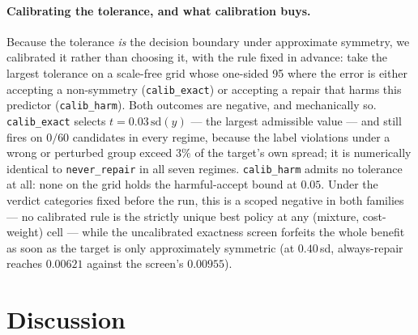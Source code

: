 \documentclass{neurips_2024}
\begin{document}
\paragraph{Calibrating the tolerance, and what calibration buys.}
Because the tolerance \emph{is} the decision boundary under approximate symmetry, we calibrated it
rather than choosing it, with the rule fixed in advance: take the largest tolerance on a scale-free
grid whose one-sided 95%
where the error is either accepting a non-symmetry (\texttt{calib\_exact}) or accepting a repair that
harms this predictor (\texttt{calib\_harm}). Both outcomes are negative, and mechanically so.
\texttt{calib\_exact} selects $t = 0.03\,\mathrm{sd}(y)$ --- the largest admissible value --- and
still fires on $0/60$ candidates in every regime, because the label violations under a wrong or
perturbed group exceed $3\%$ of the target's own spread; it is numerically identical to
\texttt{never\_repair} in all seven regimes. \texttt{calib\_harm} admits no tolerance at all: none on
the grid holds the harmful-accept bound at $0.05$. Under the verdict categories fixed before the run,
this is a scoped negative in both families --- no calibrated rule is the strictly unique best policy
at any (mixture, cost-weight) cell --- while the uncalibrated exactness screen forfeits the whole
benefit as soon as the target is only approximately symmetric (at $0.40$\,sd, always-repair reaches
$0.00621$ against the screen's $0.00955$).

\section{Discussion}
\label{sec:discussion}
\end{document}
